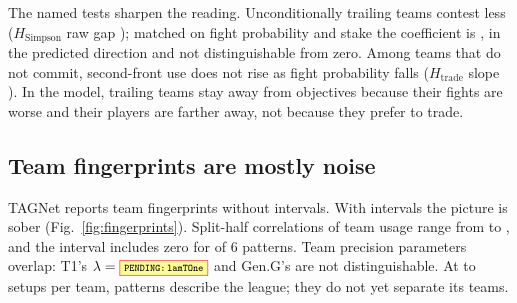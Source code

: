 The named tests sharpen the reading.
Unconditionally trailing teams contest less ($H_{\mathrm{Simpson}}$ raw gap  ); matched on fight probability and stake the coefficient is  , in the predicted direction and not distinguishable from zero.
Among teams that do not commit, second-front use does not rise as fight probability falls ($H_{\mathrm{trade}}$ slope  ).
In the model, trailing teams stay away from objectives because their fights are worse and their players are farther away, not because they prefer to trade.

\subsection{Team fingerprints are mostly noise}
\label{sec:fingerprints}


TAGNet reports team fingerprints without intervals.
With intervals the picture is sober (Fig.~\ref{fig:fingerprints}).
Split-half correlations of team usage range from  to , and the interval includes zero for  of 6 patterns.
Team precision parameters overlap: T1's $\lambda=\V{lamTOne}$  and Gen.G's   are not distinguishable.
At  to  setups per team, patterns describe the league; they do not yet separate its teams.
